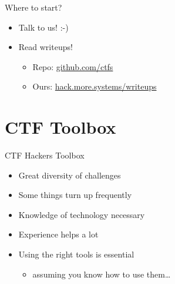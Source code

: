 \begin{frame}
	{Where to start?}

	\begin{itemize}
		\item Talk to us! :-)
	\end{itemize}

	\begin{itemize}
		\item Read writeups!
		\begin{itemize}
			\item Repo: \href{https://github.com/ctfs}{github.com/ctfs}
			\item Ours: \href{https://hack.more.systems/writeups}{hack.more.systems/writeups}
		\end{itemize}
	\end{itemize}

\end{frame}

\section{CTF Toolbox}

\begin{frame}
  {CTF Hackers Toolbox}

  \begin{itemize}
    \item Great diversity of challenges
    \item Some things turn up frequently
    \item Knowledge of technology necessary
    \item Experience helps a lot
  \end{itemize}

  \begin{itemize}
    \item Using the right tools is essential
      \begin{itemize}
        \item assuming you know how to use them\ldots
      \end{itemize}
  \end{itemize}

\end{frame}

